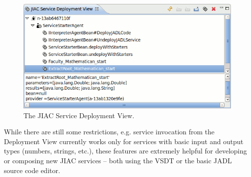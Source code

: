 \begin{figure}[ht]
	\centering
	\includegraphics[width=.5\textwidth]{figures/features/deployment-view.png}
	\caption{The JIAC Service Deployment View.}
	\label{fig:deployView}
\end{figure}

While there are still some restrictions, e.g. service invocation from the
Deployment View currently works only for services with basic input and output
types (numbers, strings, etc.), these features are extremely helpful for developing
or composing new JIAC services -- both using the VSDT or the basic JADL source
code editor.

